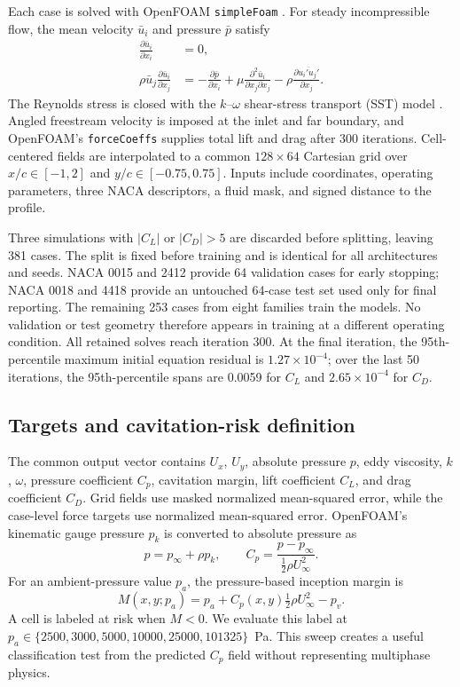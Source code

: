 \documentclass[conference]{IEEEtran}
\begin{document}
Each case is solved with OpenFOAM \texttt{simpleFoam}
\cite{weller1998tensorial}. For steady incompressible flow, the mean velocity
$\bar{u}_i$ and pressure $\bar{p}$ satisfy
\begin{align}
\frac{\partial \bar{u}_i}{\partial x_i}&=0,\\
\rho\bar{u}_j\frac{\partial\bar{u}_i}{\partial x_j}
&=-\frac{\partial\bar{p}}{\partial x_i}
+\mu\frac{\partial^2\bar{u}_i}{\partial x_j\partial x_j}
-\rho\frac{\partial\overline{u_i'u_j'}}{\partial x_j}.
\end{align}
The Reynolds stress is closed with the $k$--$\omega$ shear-stress transport
(SST) model
\cite{menter1994sst}. Angled freestream velocity is imposed at the inlet and
far boundary, and OpenFOAM's \texttt{forceCoeffs} supplies total lift and drag
after 300 iterations. Cell-centered fields are interpolated to a common
$128\times64$ Cartesian grid over $x/c\in[-1,2]$ and
$y/c\in[-0.75,0.75]$. Inputs include coordinates, operating parameters, three
NACA descriptors, a fluid mask, and signed distance to the profile.

Three simulations with $|C_L|$ or $|C_D|>5$ are discarded before splitting,
leaving 381 cases. The split is fixed before training and is identical for all
architectures and seeds. NACA 0015 and 2412 provide 64 validation cases for
early stopping; NACA 0018 and 4418 provide an untouched 64-case test set used
only for final reporting. The remaining 253 cases from eight families train
the models. No validation or test geometry therefore appears in training at a
different operating condition.
All retained solves reach iteration 300. At the final iteration, the
95th-percentile maximum initial equation residual is $1.27\times10^{-4}$; over
the last 50 iterations, the 95th-percentile spans are 0.0059 for $C_L$ and
$2.65\times10^{-4}$ for $C_D$.

\subsection{Targets and cavitation-risk definition}
The common output vector contains $U_x$, $U_y$, absolute pressure $p$, eddy
viscosity, $k$, $\omega$, pressure coefficient $C_p$, cavitation margin, lift
coefficient $C_L$, and drag coefficient $C_D$. Grid fields use masked
normalized mean-squared error, while the case-level force targets use
normalized mean-squared error. OpenFOAM's kinematic gauge pressure $p_k$ is
converted to absolute pressure as
\begin{equation}
 p=p_\infty+\rho p_k, \qquad C_p=\frac{p-p_\infty}{\tfrac{1}{2}\rho U_\infty^2}.
\end{equation}
For an ambient-pressure value $p_a$, the pressure-based inception margin is
\begin{equation}
 M(x,y;p_a)=p_a+C_p(x,y)\tfrac{1}{2}\rho U_\infty^2-p_v.
\end{equation}
A cell is labeled at risk when $M<0$. We evaluate this label at $p_a\in\{2500,3000,5000,10000,25000,101325\}$~Pa. This sweep creates a useful classification test from the predicted $C_p$ field without representing multiphase physics.
\end{document}
